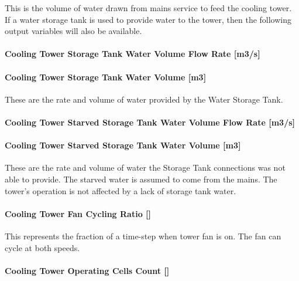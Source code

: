 This is the volume of water drawn from mains service to feed the cooling tower. If a water storage tank is used to provide water to the tower, then the following output variables will also be available.

\paragraph{Cooling Tower Storage Tank Water Volume Flow Rate {[}m3/s{]}}\label{cooling-tower-storage-tank-water-volume-flow-rate-m3s-1}

\paragraph{Cooling Tower Storage Tank Water Volume {[}m3{]}}\label{cooling-tower-storage-tank-water-volume-m3-1}

These are the rate and volume of water provided by the Water Storage Tank.

\paragraph{Cooling Tower Starved Storage Tank Water Volume Flow Rate {[}m3/s{]}}\label{cooling-tower-starved-storage-tank-water-volume-flow-rate-m3s-1}

\paragraph{Cooling Tower Starved Storage Tank Water Volume {[}m3{]}}\label{cooling-tower-starved-storage-tank-water-volume-m3-1}

These are the rate and volume of water the Storage Tank connections was not able to provide. The starved water is assumed to come from the mains. The tower's operation is not affected by a lack of storage tank water.

\paragraph{Cooling Tower Fan Cycling Ratio {[]}}\label{cooling-tower-fan-cycling-ratio-1}

This represents the fraction of a time-step when tower fan is on. The fan can cycle at both speeds.

\paragraph{Cooling Tower Operating Cells Count {[]}}\label{cooling-tower-operating-cells-count-1}

